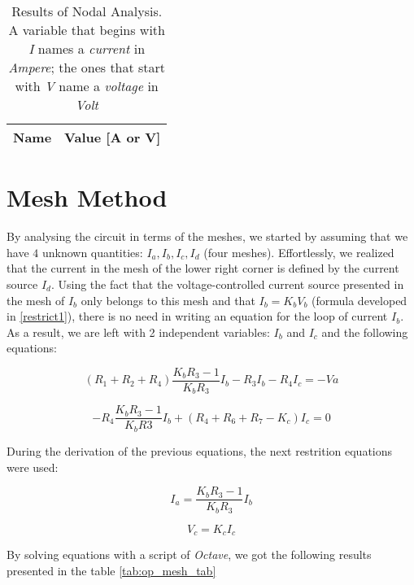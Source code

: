 \begin{table}[b]
  \centering
  \begin{tabular}{|l|r|}
    \hline
    {\bf Name} & {\bf Value [A or V]} \\ \hline
    
  \end{tabular}
  \caption{Results of Nodal Analysis. A variable that begins  with \textit{I} names a \textit{current} in \textit{Ampere}; the ones that start with \textit{V} name a \textit{voltage} in \textit{Volt} }
  \label{tab:op_nodal_tab}
\end{table}



\section{Mesh Method}

By analysing the circuit in terms of the meshes, we started by assuming that we have $4$ unknown quantities: $I_a, I_b, I_c, I_d$ (four meshes).
Effortlessly, we realized that the current in the mesh of the lower right corner is defined by the current source $I_d$.
Using the fact that the voltage-controlled current source presented in the mesh of $I_b$ only belongs to this mesh and that $I_b = K_b V_b$ (formula developed in \ref{restrict1}), there is no need in writing an equation for the loop of current $I_b$.
As a result, we are left with 2 independent variables: $I_b$ and $I_c$ and the following equations:


\begin{equation}
  (R_1 + R_2 + R_4) \frac{K_b R_3 -1}{K_b R_3}I_b  - R_3I_b  - R_4I_c = -Va
  \label{mesh1}
\end{equation}

\begin{equation}
  -R_4 \frac{K_b R_3 - 1}{K_b R3}I_b + (R_4  + R_6 + R_7 - K_c)I_c = 0
  \label{mesh2}
\end{equation}

During the derivation of the previous equations, the next restrition equations were used:

\begin{equation}
  I_a = \frac{K_b R_3 -1}{K_b R_3} I_b
  \label{restrict1}
\end{equation}

\begin{equation}
  V_c = K_c I_c
  \label{restrict2}
\end{equation}

By solving equations with a script of \textit{Octave}, we got the following results presented in the table \ref{tab:op_mesh_tab}

